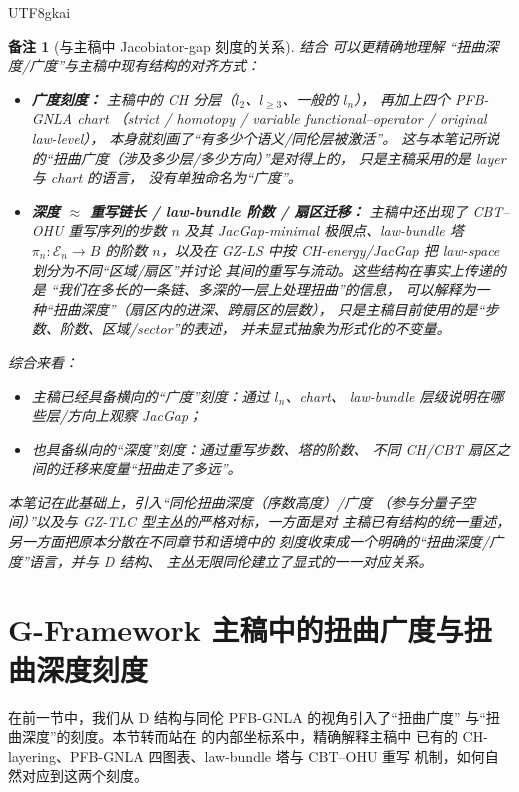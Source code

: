 \documentclass[12pt]{article}
\newtheorem{remark}{备注}[section]
\begin{document}
\begin{CJK*}{UTF8}{gkai}
\begin{remark}[与主稿中 Jacobiator-gap 刻度的关系]
结合 \cite{GaoZheng2025GFramework} 可以更精确地理解
“扭曲深度/广度”与主稿中现有结构的对齐方式：
\begin{itemize}
  \item \textbf{广度刻度：}
        主稿中的 CH 分层（$l_2$、$l_{\ge3}$、一般的 $l_n$），
        再加上四个 PFB-GNLA chart
        （strict / homotopy /
        variable functional--operator / original law-level），
        本身就刻画了“有多少个语义/同伦层被激活”。
        这与本笔记所说的“扭曲广度（涉及多少层/多少方向）”是对得上的，
        只是主稿采用的是 layer 与 chart 的语言，
        没有单独命名为“广度”。
  \item \textbf{深度 $\approx$ 重写链长 / law-bundle 阶数 / 扇区迁移：}
        主稿中还出现了 CBT--OHU 重写序列的步数 $n$ 及其
        JacGap-minimal 极限点、law-bundle 塔
        $\pi_n:\mathcal{E}_n\to B$ 的阶数 $n$，以及在 GZ-LS 中按
        CH-energy/JacGap 把 law-space 划分为不同“区域/扇区”并讨论
        其间的重写与流动。这些结构在事实上传递的是
        “我们在多长的一条链、多深的一层上处理扭曲”的信息，
        可以解释为一种“扭曲深度”（扇区内的进深、跨扇区的层数），
        只是主稿目前使用的是“步数、阶数、区域/sector”的表述，
        并未显式抽象为形式化的不变量。
\end{itemize}

综合来看：
\begin{itemize}
  \item 主稿已经具备横向的“广度”刻度：通过 $l_n$、chart、
        law-bundle 层级说明在哪些层/方向上观察 JacGap；
  \item 也具备纵向的“深度”刻度：通过重写步数、塔的阶数、
        不同 CH/CBT 扇区之间的迁移来度量“扭曲走了多远”。
\end{itemize}

本笔记在此基础上，引入“同伦扭曲深度（序数高度）/广度
（参与分量子空间）”以及与 GZ-TLC 型主丛的严格对标，一方面是对
主稿已有结构的统一重述，另一方面把原本分散在不同章节和语境中的
刻度收束成一个明确的“扭曲深度/广度”语言，并与 D 结构、
主丛无限同伦建立了显式的一一对应关系。
\end{remark}

\section{G-Framework 主稿中的扭曲广度与扭曲深度刻度}

在前一节中，我们从 D 结构与同伦 PFB-GNLA 的视角引入了“扭曲广度”
与“扭曲深度”的刻度。本节转而站在
\cite{GaoZheng2025GFramework} 的内部坐标系中，精确解释主稿中
已有的 CH-layering、PFB-GNLA 四图表、law-bundle 塔与 CBT--OHU 重写
机制，如何自然对应到这两个刻度。


\end{CJK*}
\end{document}

